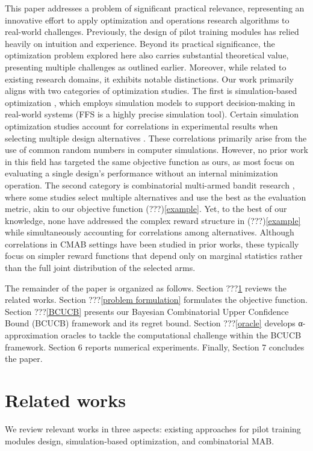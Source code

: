 \documentclass[opre,sglanonrev]{informs4}
\begin{document}
This paper addresses a problem of significant practical relevance, representing an innovative effort to apply optimization and operations research algorithms to real-world challenges. Previously, the design of pilot training modules has relied heavily on intuition and experience. Beyond its practical significance, the optimization problem explored here also carries substantial theoretical value, presenting multiple challenges as outlined earlier. Moreover, while related to existing research domains, it exhibits notable distinctions. Our work primarily aligns with two categories of optimization studies. The first is simulation-based optimization \citep{Fu2015}, which employs simulation models to support decision-making in real-world systems (FFS is a highly precise simulation tool). Certain simulation optimization studies account for correlations in experimental results when selecting multiple design alternatives \citep{xie2016bayesian}. These correlations primarily arise from the use of common random numbers in computer simulations. However, no prior work in this field has targeted the same objective function as ours, as most focus on evaluating a single design’s performance without an internal minimization operation. The second category is combinatorial multi-armed bandit research \citep{Chen2013}, where some studies select multiple alternatives and use the best as the evaluation metric, akin to our objective function (???)\eqref{example}. Yet, to the best of our knowledge, none have addressed the complex reward structure in (???)\eqref{example} while simultaneously accounting for correlations among alternatives. Although correlations in CMAB settings have been studied in prior works, these typically focus on simpler reward functions that depend only on marginal statistics rather than the full joint distribution of the selected arms. 

The remainder of the paper is organized as follows. Section ???\ref{related works} reviews the related works. Section ???\ref{problem formulation} formulates the objective function. Section ???\ref{BCUCB} presents our Bayesian Combinatorial Upper Confidence Bound (BCUCB) framework and its regret bound. Section ???\ref{oracle} develops α\alpha-approximation oracles to tackle the computational challenge within the BCUCB framework. Section 6 reports numerical experiments. Finally, Section 7 concludes the paper.

\section{Related works}
\label{related works}
We review relevant works in three aspects: existing approaches for pilot training modules design, simulation-based optimization, and combinatorial MAB.
\end{document}
